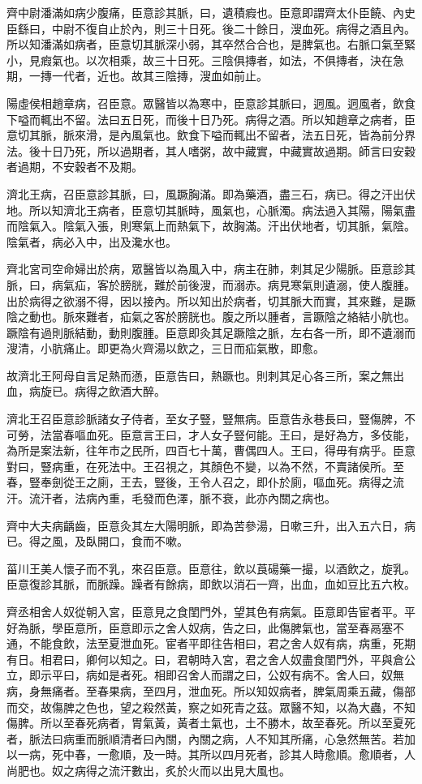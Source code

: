 齊中尉潘滿如病少腹痛，臣意診其脈，曰，遺積瘕也。臣意即謂齊太仆臣饒、內史臣繇曰，中尉不復自止於內，則三十日死。後二十餘日，溲血死。病得之酒且內。所以知潘滿如病者，臣意切其脈深小弱，其卒然合合也，是脾氣也。右脈口氣至緊小，見瘕氣也。以次相乘，故三十日死。三陰俱摶者，如法，不俱摶者，決在急期，一摶一代者，近也。故其三陰摶，溲血如前止。

陽虛侯相趙章病，召臣意。眾醫皆以為寒中，臣意診其脈曰，迵風。迵風者，飲食下嗌而輒出不留。法曰五日死，而後十日乃死。病得之酒。所以知趙章之病者，臣意切其脈，脈來滑，是內風氣也。飲食下嗌而輒出不留者，法五日死，皆為前分界法。後十日乃死，所以過期者，其人嗜粥，故中藏實，中藏實故過期。師言曰安穀者過期，不安穀者不及期。

濟北王病，召臣意診其脈，曰，風蹶胸滿。即為藥酒，盡三石，病已。得之汗出伏地。所以知濟北王病者，臣意切其脈時，風氣也，心脈濁。病法過入其陽，陽氣盡而陰氣入。陰氣入張，則寒氣上而熱氣下，故胸滿。汗出伏地者，切其脈，氣陰。陰氣者，病必入中，出及瀺水也。

齊北宮司空命婦出於病，眾醫皆以為風入中，病主在肺，刺其足少陽脈。臣意診其脈，曰，病氣疝，客於膀胱，難於前後溲，而溺赤。病見寒氣則遺溺，使人腹腫。出於病得之欲溺不得，因以接內。所以知出於病者，切其脈大而實，其來難，是蹶陰之動也。脈來難者，疝氣之客於膀胱也。腹之所以腫者，言蹶陰之絡結小肮也。蹶陰有過則脈結動，動則腹腫。臣意即灸其足蹶陰之脈，左右各一所，即不遺溺而溲清，小肮痛止。即更為火齊湯以飲之，三日而疝氣散，即愈。

故濟北王阿母自言足熱而懣，臣意告曰，熱蹶也。則刺其足心各三所，案之無出血，病旋已。病得之飲酒大醉。

濟北王召臣意診脈諸女子侍者，至女子豎，豎無病。臣意告永巷長曰，豎傷脾，不可勞，法當春嘔血死。臣意言王曰，才人女子豎何能。王曰，是好為方，多伎能，為所是案法新，往年市之民所，四百七十萬，曹偶四人。王曰，得毋有病乎。臣意對曰，豎病重，在死法中。王召視之，其顏色不變，以為不然，不賣諸侯所。至春，豎奉劍從王之廁，王去，豎後，王令人召之，即仆於廁，嘔血死。病得之流汗。流汗者，法病內重，毛發而色澤，脈不衰，此亦內關之病也。

齊中大夫病齲齒，臣意灸其左大陽明脈，即為苦參湯，日嗽三升，出入五六日，病已。得之風，及臥開口，食而不嗽。

菑川王美人懷子而不乳，來召臣意。臣意往，飲以莨碭藥一撮，以酒飲之，旋乳。臣意復診其脈，而脈躁。躁者有餘病，即飲以消石一齊，出血，血如豆比五六枚。

齊丞相舍人奴從朝入宮，臣意見之食閨門外，望其色有病氣。臣意即告宦者平。平好為脈，學臣意所，臣意即示之舍人奴病，告之曰，此傷脾氣也，當至春鬲塞不通，不能食飲，法至夏泄血死。宦者平即往告相曰，君之舍人奴有病，病重，死期有日。相君曰，卿何以知之。曰，君朝時入宮，君之舍人奴盡食閨門外，平與倉公立，即示平曰，病如是者死。相即召舍人而謂之曰，公奴有病不。舍人曰，奴無病，身無痛者。至春果病，至四月，泄血死。所以知奴病者，脾氣周乘五藏，傷部而交，故傷脾之色也，望之殺然黃，察之如死青之茲。眾醫不知，以為大蟲，不知傷脾。所以至春死病者，胃氣黃，黃者土氣也，土不勝木，故至春死。所以至夏死者，脈法曰病重而脈順清者曰內關，內關之病，人不知其所痛，心急然無苦。若加以一病，死中春，一愈順，及一時。其所以四月死者，診其人時愈順。愈順者，人尚肥也。奴之病得之流汗數出，炙於火而以出見大風也。

